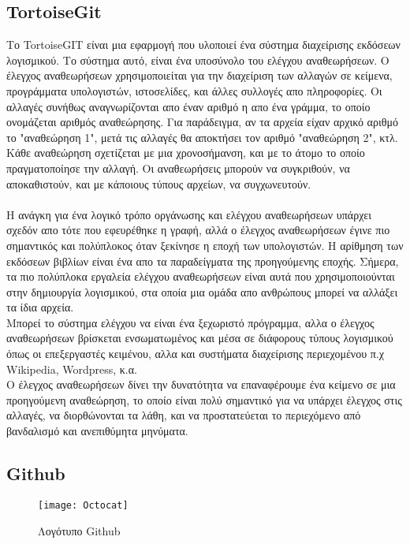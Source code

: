\subsection{TortoiseGit}
Το TortoiseGIT είναι μια εφαρμογή που υλοποιεί ένα σύστημα διαχείρισης εκδόσεων λογισμικού. Το σύστημα αυτό, είναι ένα υποσύνολο του ελέγχου αναθεωρήσεων. Ο έλεγχος αναθεωρήσεων χρησιμοποιείται για την διαχείριση των αλλαγών σε κείμενα, προγράμματα υπολογιστών, ιστοσελίδες, και άλλες συλλογές απο πληροφορίες. Οι αλλαγές συνήθως αναγνωρίζονται απο έναν αριθμό η απο ένα γράμμα, το οποίο ονομάζεται αριθμός αναθεώρησης. Για παράδειγμα, αν τα αρχεία είχαν αρχικό αριθμό το "αναθεώρηση 1", μετά τις αλλαγές θα αποκτήσει τον αριθμό "αναθεώρηση 2", κτλ. Κάθε αναθεώρηση σχετίζεται με μια χρονοσήμανση, και με το άτομο το οποίο πραγματοποίησε την αλλαγή. Οι αναθεωρήσεις μπορούν να συγκριθούν, να αποκαθιστούν, και με κάποιους τύπους αρχείων, να συγχωνευτούν.\\
\\
Η ανάγκη για ένα λογικό τρόπο οργάνωσης και ελέγχου αναθεωρήσεων υπάρχει σχεδόν απο τότε που εφευρέθηκε η γραφή, αλλά ο έλεγχος αναθεωρήσεων έγινε πιο σημαντικός και πολύπλοκος όταν ξεκίνησε η εποχή των υπολογιστών. Η αρίθμηση των εκδόσεων βιβλίων είναι ένα απο τα παραδείγματα της προηγούμενης εποχής. Σήμερα, τα πιο πολύπλοκα εργαλεία ελέγχου αναθεωρήσεων είναι αυτά που χρησιμοποιούνται στην δημιουργία λογισμικού, στα οποία μια ομάδα απο ανθρώπους μπορεί να αλλάξει τα ίδια αρχεία.\\
Μπορεί το σύστημα ελέγχου να είναι ένα ξεχωριστό πρόγραμμα, αλλα ο έλεγχος αναθεωρήσεων βρίσκεται ενσωματωμένος και μέσα σε διάφορους τύπους λογισμικού όπως οι επεξεργαστές κειμένου, αλλα και συστήματα διαχείρισης περιεχομένου
π.χ Wikipedia, Wordpress, κ.α.\\
Ο έλεγχος αναθεωρήσεων δίνει την δυνατότητα να επαναφέρουμε ένα κείμενο σε μια προηγούμενη αναθεώρηση, το οποίο είναι πολύ σημαντικό για να υπάρχει έλεγχος στις αλλαγές, να διορθώνονται τα λάθη, και να προστατεύεται το περιεχόμενο από βανδαλισμό και ανεπιθύμητα μηνύματα.
\subsection{Github}
\begin{figure}[h]
\centering
\texttt{[image: Octocat]}
\caption{Λογότυπο Github}
\end{figure}